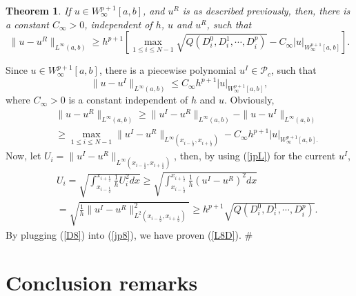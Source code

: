 \documentclass{article}
\newtheorem{theorem}{Theorem}[section]
\numberwithin{equation}{section}
\begin{document}
\begin{spacing}{1.15}
\begin{theorem} \label{Tinfinity}
If $u \in W^{p+1}_{\infty}[a,b]$, and $u^R$ is as described previously, then,
there is a constant $C_\infty>0$, independent of $h$, $u$ and $u^R$,
such that
\begin{equation} \label{L8D}
\|u - u^R\|_{L^{\infty}(a,b)} \ge  h^{p+1} \left[\max_{1\le i \le
N-1} \sqrt{ Q(D^0_i,D^1_i,\cdots,D^p_i)} - C_\infty
|u|_{W^{p+1}_{\infty}[a,b]} \right].
\end{equation}
\end{theorem}
Since $u \in W^{p+1}_{\infty}[a,b]$, there is a piecewise polynomial $u^I \in {\mathcal P}_c$, such that
$$
\|u-u^I\|_{L^{\infty} (a,b)} \le  C_\infty h^{p+1}
|u|_{W^{p+1}_{\infty}[a,b]},
$$
where $C_\infty >0$ is a constant independent of $h$ and $u$.
Obviously,
\begin{eqnarray}
&& \|u-u^R\|_{L^{\infty} (a,b)} \ge \|u^I-u^R\|_{L^{\infty} (a,b)} - \|u-u^I\|_{L^{\infty} (a,b)} \nonumber \\
&& \ge  \max_{1 \le i \le N-1}
\|u^I-u^R\|_{L^{\infty}(x_{i-\frac{1}{2}},x_{i+\frac{1}{2}})}  -
C_\infty h^{p+1} |u|_{W^{p+1}_{\infty}[a,b].} \label{jp8}
\end{eqnarray}
Now, let $U_i =  \|u^I-u^R\|_{L^{\infty}(x_{i-\frac{1}{2}},x_{i+\frac{1}{2}})}$, then, by using (\ref{jpL}) for the current $u^I$,
\begin{eqnarray}
&& U_i = \sqrt{ \int_{x_{i-\frac{1}{2}}}^{x_{i+\frac{1}{2}}} \frac{1}{h} U_i^2 dx } \ge  \sqrt{ \int_{x_{i-\frac{1}{2}}}^{x_{i+\frac{1}{2}}} \frac{1}{h} (u^I-u^R)^2 dx } \nonumber \\
&& =  \sqrt{ \frac{1}{h} \|u^I-u^R\|^2_{L^2 (x_{i-\frac{1}{2}},x_{i+\frac{1}{2}})}  }
\ge h^{p+1} \sqrt{ Q(D^0_i,D^1_i,\cdots,D^p_i)}. \label{D8}
\end{eqnarray}
By plugging (\ref{D8}) into (\ref{jp8}), we have proven (\ref{L8D}).
\#

\section{Conclusion remarks}


\end{spacing}
\end{document}
